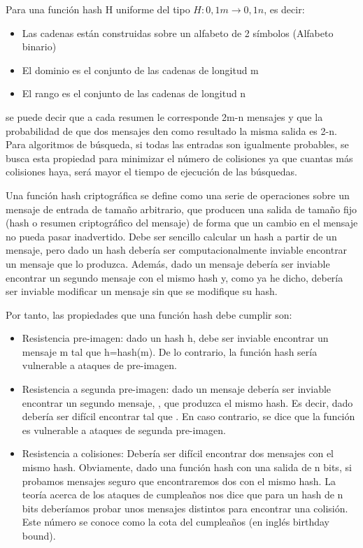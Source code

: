 \documentclass[spanish]{article}
\begin{document}
Para una función hash H uniforme del tipo $H:{0,1}m→{0,1}n$, es decir:
\begin{itemize}
\item Las cadenas están construidas sobre un alfabeto de 2 símbolos (Alfabeto binario)
\item El dominio es el conjunto de las cadenas de longitud m
\item El rango es el conjunto de las cadenas de longitud n\\
\end{itemize}
se puede decir que a cada resumen le corresponde 2m-n mensajes y que la probabilidad de que dos mensajes den como resultado la misma salida es 2-n. Para algoritmos de búsqueda, si todas las entradas son igualmente probables, se busca esta propiedad para minimizar el número de colisiones ya que cuantas más colisiones haya, será mayor el tiempo de ejecución de las búsquedas.

Una función hash criptográfica se define como una serie de operaciones sobre un mensaje de entrada de tamaño arbitrario, que producen una salida de tamaño fijo (hash o resumen criptográfico del mensaje) de forma que un cambio en el mensaje no pueda pasar inadvertido. Debe ser sencillo calcular un hash a partir de un mensaje, pero dado un hash debería ser computacionalmente inviable encontrar un mensaje que lo produzca. Además, dado un mensaje debería ser inviable encontrar un segundo mensaje con el mismo hash y, como ya he dicho, debería ser inviable modificar un mensaje sin que se modifique su hash.

Por tanto, las propiedades que una función hash debe cumplir son:
\begin{itemize}
\item Resistencia pre-imagen: dado un hash h, debe ser inviable encontrar un mensaje m tal que h=hash(m). De lo contrario, la función hash sería vulnerable a ataques de pre-imagen.
\item Resistencia a segunda pre-imagen: dado un mensaje  debería ser inviable encontrar un segundo mensaje, , que produzca el mismo hash. Es decir, dado  debería ser difícil encontrar  tal que . En caso contrario, se dice que la función es vulnerable a ataques de segunda pre-imagen.
\item Resistencia a colisiones: Debería ser difícil encontrar dos mensajes con el mismo hash. Obviamente, dado una función hash con una salida de n bits, si probamos   mensajes seguro que encontraremos dos con el mismo hash. La teoría acerca de los ataques de cumpleaños nos dice que para un hash de n bits deberíamos probar unos  mensajes distintos para encontrar una colisión. Este número se conoce como la cota del cumpleaños (en inglés birthday bound).
\end{itemize}
\end{document}
